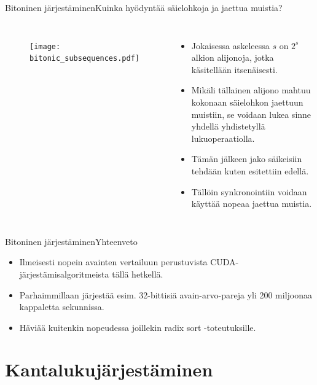 \documentclass{beamer}
\begin{document}
\begin{frame}{Bitoninen järjestäminen}{Kuinka hyödyntää säielohkoja ja jaettua muistia?}
\begin{columns}
    \begin{figure}
        \texttt{[image: bitonic\_subsequences.pdf]}
    \end{figure}
    \begin{itemize}
      \item
        Jokaisessa askeleessa $s$ on $2^s$ alkion alijonoja, jotka käsitellään itsenäisesti.
      \item
        Mikäli tällainen alijono mahtuu kokonaan säielohkon jaettuun muistiin, se voidaan lukea sinne yhdellä yhdistetyllä lukuoperaatiolla.
      \item
        Tämän jälkeen jako säikeisiin tehdään kuten esitettiin edellä.
      \item
        Tällöin synkronointiin voidaan käyttää nopeaa jaettua muistia.
    \end{itemize}
\end{columns}
\end{frame}

\begin{frame}{Bitoninen järjestäminen}{Yhteenveto}
    \begin{itemize}
      \item
        Ilmeisesti nopein avainten vertailuun perustuvista CUDA-järjestämisalgoritmeista tällä hetkellä.
      \item
        Parhaimmillaan järjestää esim. 32-bittisiä avain-arvo-pareja yli 200 miljoonaa kappaletta sekunnissa.
      \item
        Häviää kuitenkin nopeudessa joillekin radix sort -toteutuksille.
    \end{itemize}
\end{frame}

\section{Kantalukujärjestäminen}
\end{document}
